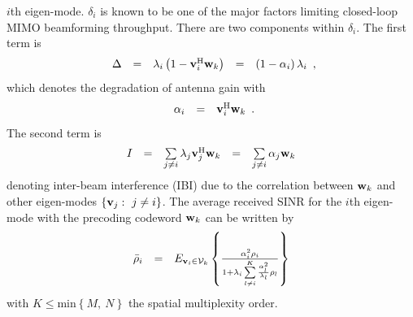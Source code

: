 \documentclass[conference]{IEEEtran}
\newcommand{\bv}{{\bf v}}
\newcommand{\bw}{{\bf w}}
\begin{document}
$i$th eigen-mode. $\delta_{i}$ is known to be one of the major
factors limiting closed-loop MIMO beamforming throughput. There
are two components within $\delta_{i}$. The first term is
\begin{equation}
\begin{array}{rcccl}
\Delta&=&\lambda_{i}\left(1-\bv_{i}^{\rm
H}\bw_k\right)&=&\left(1-\alpha_{i}\right)\lambda_{i}
\end{array},
\end{equation}
\noindent which denotes the degradation of antenna gain with
\begin{equation}
\begin{array}{rcl}
\alpha_{i}&=&\bv_{i}^{\rm H}\bw_k
\end{array}.\label{alpha}
\end{equation}
\noindent The second term is
\begin{equation}
\begin{array}{rcccl}
I_{} & = & \sum\limits_{j\neq i}\lambda_{j}\bv_{j}^{\rm
H}\bw_{k}&=&\sum\limits_{j\neq i}\alpha_{j}\bw_{k}
\end{array}\label{IBI}
\end{equation}
\noindent denoting inter-beam interference (IBI) due to the
correlation between $\bw_{k}$ and other eigen-modes
$\left\{\bv_{j}:\ j\neq i\right\}$. The average received SINR for
the $i$th eigen-mode with the precoding codeword $\bw_{k}$ can be
written by
\begin{equation}
\begin{array}{rcl}
\bar\rho_{i}&=&\mbox{E}_{\bv_{i}\in{\cal
V}_{k}}\left\{\frac{\alpha_{i}^{2}\rho_{i}}{1+
\lambda_{i}\sum\limits_{l\neq
i}^{K}\frac{\alpha_{l}^{2}}{\lambda_{l}}\rho_{l}}\right\}
\end{array}\label{bar_rho}
\end{equation}
\noindent with $K\leq\mbox{min}\left\{M,\ N\right\}$ the spatial
multiplexity order.
\end{document}
